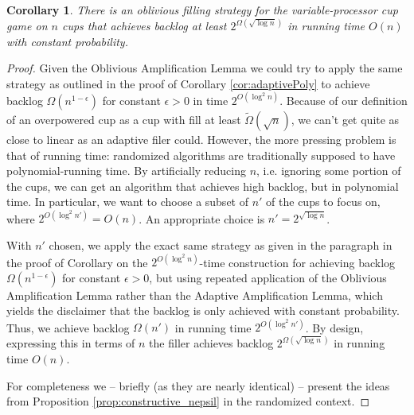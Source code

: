 \documentclass[twocolumn]{article}[10pt]
\newtheorem{corollary}{Corollary}
\begin{document}
\begin{corollary}
 \label{cor:obliviousPoly}
  There is an oblivious filling strategy for the variable-processor cup game on
  $n$ cups that achieves backlog at least $2^{\Omega(\sqrt{\log n})}$ in
  running time $O(n)$ with constant probability.
\end{corollary}
\begin{proof}
  Given the Oblivious Amplification Lemma we could try to apply the same
  strategy as outlined in the proof of Corollary \ref{cor:adaptivePoly} 
  to achieve backlog $\Omega(n^{1-\epsilon})$ for constant $\epsilon >0$ in time $2^{O(\log^2 n)}$.
  Because of our definition of an overpowered cup as a cup with fill at least
  $\tilde{\Omega}(\sqrt{n})$, we can't get quite as close to linear as an
  adaptive filer could. However, the more pressing problem is that of running
  time: randomized algorithms are traditionally supposed to have polynomial-running time.
  By artificially reducing $n$, i.e. ignoring some portion of the cups, we can
  get an algorithm that achieves high backlog, but in polynomial time.
  In particular, we want to choose a subset of $n'$ of the cups to focus on,
  where $2^{O(\log^2 n')} = O(n)$. An appropriate choice is $n' = 2^{\sqrt{\log n}}$.

  With $n'$ chosen, we apply the exact same strategy as given in the paragraph
  in the proof of Corollary on the $2^{O(\log^2 n)}$-time construction for
  achieving backlog $\Omega(n^{1-\epsilon})$ for constant $\epsilon >0$, but using
  repeated application of the Oblivious Amplification Lemma rather than the
  Adaptive Amplification Lemma, which yields the disclaimer that the backlog is
  only achieved with constant probability.
  Thus, we achieve backlog $\Omega(n')$ in running time $2^{O(\log^2
  n')}$. By design, expressing this in terms of $n$ the filler achieves 
  backlog $2^{\Omega(\sqrt{\log n})}$ in running time $O(n)$.

  For completeness we -- briefly (as they are nearly identical) -- present the
  ideas from Proposition \ref{prop:constructive_nepsil} in the randomized
  context.


\end{proof}
\end{document}
